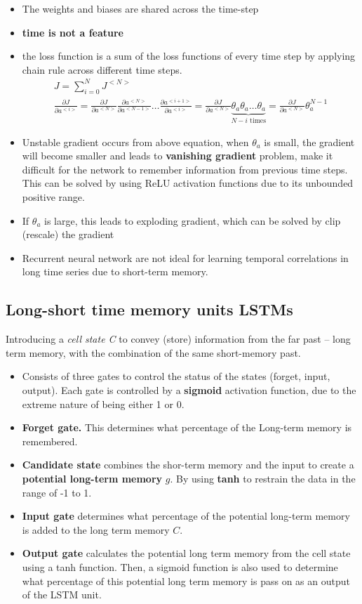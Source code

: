\documentclass[a4paper,10pt]{article}
\begin{document}
\begin{itemize}
    \item The weights and biases are shared across the time-step
    \item \textbf{time is not a feature}
    \item the loss function is a sum of the loss functions of every time step by applying chain rule across different time steps. 
        \begin{gather*}
            J = \sum_{i=0}^{N}J^{<N>}\\
            \frac{\partial J}{\partial a^{<i>}} = \frac{\partial J}{\partial a^{<N>}}\frac{\partial a^{<N>}}{\partial a^{<N-1>}}\dots\frac{\partial a^{<i+1>}}{\partial a^{<i>}} = \frac{\partial J}{\partial a^{<N>}}\underbrace{\theta_a\theta_a\dots\theta_a}_{N-i\text{ times}} = \frac{\partial J}{\partial a^{<N>}}\theta_a^{N-1}
        \end{gather*}
    \item Unstable gradient occurs from above equation, when $\theta_a$ is small, the gradient will become smaller and leads to \textbf{vanishing gradient} problem,  make it difficult for the network to remember information from previous time steps. This can be solved by using ReLU activation functions due to its unbounded positive range. 
    \item If $\theta_a$ is large, this leads to exploding gradient, which can be solved by clip (rescale) the gradient
    \item Recurrent neural network are not ideal for learning temporal correlations in long time series due to short-term memory. 
\end{itemize}

\subsection{Long-short time memory units LSTMs}
Introducing a \textit{cell state C} to convey (store) information from the far past -- long term memory, with the combination of the same short-memory past. 
\begin{itemize}
    \item Consists of three gates to control the status of the states (forget, input, output). Each gate is controlled by a \textbf{sigmoid} activation function, due to the extreme nature of being either 1 or 0.
    \item \textbf{Forget gate.} This determines what percentage of the Long-term memory is remembered. 
    \item \textbf{Candidate state} combines the shor-term memory and the input to create a \textbf{potential long-term memory} $g$. By using \textbf{tanh} to restrain the data in the range of -1 to 1. 
    \item \textbf{Input gate} determines what percentage of the potential long-term memory is added to the long term memory $C$.
    \item \textbf{Output gate} calculates the potential long term memory from the cell state using a tanh function. Then, a sigmoid function is also used to determine what percentage of this potential long term memory is pass on as an output of the LSTM unit. 
\end{itemize}
\end{document}
